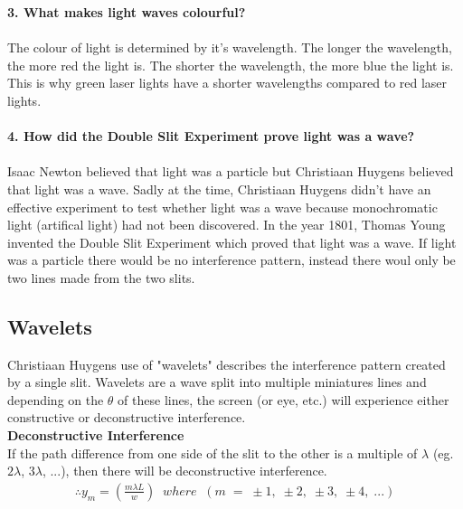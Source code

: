 \documentclass{article}
\begin{document}
\noindent\textbf{3. What makes light waves colourful?}\\\\
The colour of light is determined by it's wavelength. The longer the wavelength, the more red the light is. The shorter the wavelength, the more blue the light is. This is why green laser lights have a shorter wavelengths compared to red laser lights.\\\\

\noindent\textbf{4. How did the Double Slit Experiment prove light was a wave?}\\\\
Isaac Newton believed that light was a particle but Christiaan Huygens believed that light was a wave. Sadly at the time, Christiaan Huygens didn't have an effective experiment to test whether light was a wave because monochromatic light (artifical light) had not been discovered. In the year 1801, Thomas Young invented the Double Slit Experiment which proved that light was a wave. If light was a particle there would be no interference pattern, instead there woul only be two lines made from the two slits.

\vspace{3cm}

\subsection{Wavelets}
Christiaan Huygens use of "wavelets" describes the interference pattern created by a single slit. Wavelets are a wave split into multiple miniatures lines and depending on the $\theta$ of these lines, the screen (or eye, etc.) will experience either constructive or deconstructive interference.\\

\noindent\textbf{Deconstructive Interference}\\
If the path difference from one side of the slit to the other is a multiple of $\lambda$ (eg. $2\lambda$, $3\lambda$, ...), then there will be deconstructive interference.
\begin{align*}
    \therefore y_m = \left(\frac{m\lambda L}{w}\right)\;\; where\;\;(m\;=\;\pm 1,\;\pm 2,\;\pm 3,\;\pm 4,\;...)
\end{align*}\leavevmode\\
\end{document}
